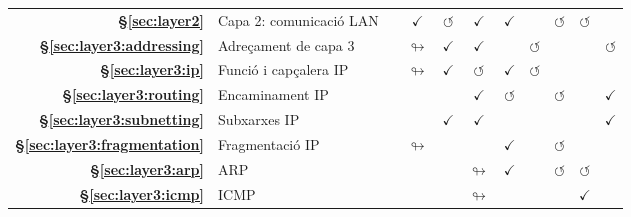 {\begin{tabular}{rl ccccccccc}
    \textbf{\S\ref{sec:layer2}}    & Capa 2: comunicació LAN                       &                   & $\checkmark$       & $\circlearrowleft$ & $\checkmark$       & $\checkmark$       &                      & $\circlearrowleft$      & $\circlearrowleft$   &                      \\
    \rowcolor{color1!15!white}
    \textbf{\S\ref{sec:layer3:addressing}}  & Adreçament de capa 3                               &                   & $\looparrowright$  & $\checkmark$       & $\checkmark$       &                    & $\circlearrowleft$   &                         &                      & $\circlearrowleft$   \\
    \textbf{\S\ref{sec:layer3:ip}}  & Funció i capçalera IP                                               &                   & $\looparrowright$  & $\checkmark$       & $\circlearrowleft$ & $\checkmark$       & $\circlearrowleft$   &                         &                      &                      \\
    \rowcolor{color1!15!white}
    \textbf{\S\ref{sec:layer3:routing}}  & Encaminament IP                                       &                   &                    &                    & $\checkmark$       & $\circlearrowleft$ &                      & $\circlearrowleft$      &                      & $\checkmark$         \\
    \textbf{\S\ref{sec:layer3:subnetting}}  & Subxarxes IP                                    &                   &                    & $\checkmark$       & $\checkmark$       &                    &                      &                         &                      & $\checkmark$         \\
    \rowcolor{color1!15!white}
    \textbf{\S\ref{sec:layer3:fragmentation}}  & Fragmentació IP                                 &                   & $\looparrowright$  &                    &                    & $\checkmark$       &                      & $\circlearrowleft$      &                      &                      \\
    \textbf{\S\ref{sec:layer3:arp}}  & ARP                                              &                   &                    &                    & $\looparrowright$  & $\checkmark$       &                      & $\circlearrowleft$      & $\circlearrowleft$   &                      \\
    \rowcolor{color1!15!white}
    \textbf{\S\ref{sec:layer3:icmp}}  & ICMP                                             &                   &                    &                    & $\looparrowright$  &                    &                      &                         & $\checkmark$         &                      \\

\end{tabular}}
